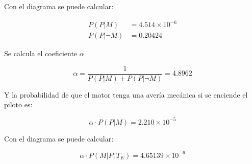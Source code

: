 \documentclass[11pt]{article}
\begin{document}

Con el diagrama se puede calcular:


\begin{align*}

P(P | M) & = 4.514 \times 10^{-6}
\\ 
P(P | \neg M ) & = 0.20424 

\end{align*}


Se calcula el coeficiente $\alpha$

$$
\alpha = \frac{1}{P(P|M) + P(P | \neg M)} = 4.8962
$$

Y la probabilidad de que el motor tenga una avería mecánica si se enciende el piloto es:

$$
\alpha \cdot P(P | M) = 2.210 \times 10^{-5} 
$$


Con el diagrama se puede calcular:

$$
\alpha \cdot P(M | P, T_E) = 4.65139 \times 10^{-6} 
$$
\end{document}
